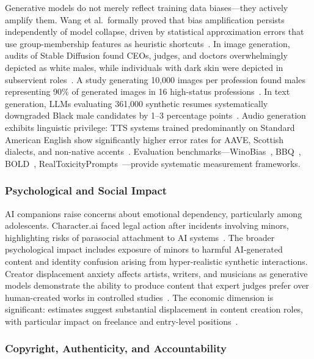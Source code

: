 Generative models do not merely reflect training data biases---they actively amplify them. Wang et al.\ formally proved that bias amplification persists independently of model collapse, driven by statistical approximation errors that use group-membership features as heuristic shortcuts~\cite{wang2024biasamplification}. In image generation, audits of Stable Diffusion found CEOs, judges, and doctors overwhelmingly depicted as white males, while individuals with dark skin were depicted in subservient roles~\cite{bloomberg2023sdbias}. A study generating 10,000 images per profession found males representing 90\% of generated images in 16 high-status professions~\cite{sdxl2024bias}. In text generation, LLMs evaluating 361,000 synthetic resumes systematically downgraded Black male candidates by 1--3 percentage points~\cite{pnas2024llmbias}. Audio generation exhibits linguistic privilege: TTS systems trained predominantly on Standard American English show significantly higher error rates for AAVE, Scottish dialects, and non-native accents~\cite{michel2025accentbias}. Evaluation benchmarks---WinoBias~\cite{zhao2018winobias}, BBQ~\cite{parrish2022bbq}, BOLD~\cite{dhamala2021bold}, RealToxicityPrompts~\cite{gehman2020toxicity}---provide systematic measurement frameworks.


\subsubsection{Psychological and Social Impact}
\label{sec:threat-psych}

AI companions raise concerns about emotional dependency, particularly among adolescents. Character.ai faced legal action after incidents involving minors, highlighting risks of parasocial attachment to AI systems~\cite{characterai2024}. The broader psychological impact includes exposure of minors to harmful AI-generated content and identity confusion arising from hyper-realistic synthetic interactions. Creator displacement anxiety affects artists, writers, and musicians as generative models demonstrate the ability to produce content that expert judges prefer over human-created works in controlled studies~\cite{chi2026creative}. The economic dimension is significant: estimates suggest substantial displacement in content creation roles, with particular impact on freelance and entry-level positions~\cite{aisafetyreport2026}.


\subsubsection{Copyright, Authenticity, and Accountability}
\label{sec:threat-copyright}

